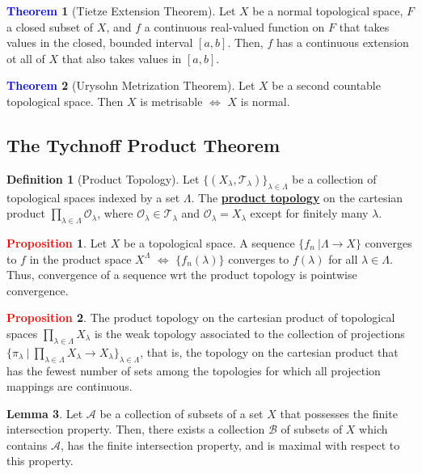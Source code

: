 \documentclass[11pt]{article}
\newcommand{\open}[0]{\mathcal{O}}
\newcommand{\topo}[0]{\mathcal{T}}
\theoremstyle{definition}
\theoremstyle{definition}
\newcommand{\dfn}[1]{\underline{\textbf{#1}}}
\newtheorem{theorem}{\textcolor{blue}{Theorem}}
\newtheorem{lemma}[theorem]{Lemma}
\theoremstyle{definition}
\newtheorem{definition}{\textcolor{OliveGreen}{Definition}}
\newtheorem{prop}{\textcolor{red}{Proposition}}
\theoremstyle{remark}
\begin{document}
\begin{theorem}[Tietze Extension Theorem]
	Let $X$ be a normal topological space, $F$ a closed subset of $X$, and $f$ a continuous real-valued function on $F$ that takes values in the closed, bounded interval $[a,b]$. Then, $f$ has a continuous extension ot all of $X$ that also takes values in $[a,b]$. 
\end{theorem}

\begin{theorem}[Urysohn Metrization Theorem] 
	Let $X$ be a second countable topological space. Then $X$ is metrisable $\iff$ $X$ is normal. 
\end{theorem}


\subsection{The Tychnoff Product Theorem}

\begin{definition}[Product Topology]
	Let $\{ (X_\lambda, \topo_\lambda ) \}_{\lambda \in \Lambda} $ be a collection of topological spaces indexed by a set $\Lambda$. The \dfn{product topology} on the cartesian product $\prod_{\lambda \in \Lambda} \open_\lambda$, where $\open_\lambda \in \topo_\lambda$ and $\open_\lambda = X_\lambda$ except for finitely many $\lambda$. 
\end{definition}

\begin{prop}
	Let $X$ be a topological space. A sequence $\{ f_n\ | \Lambda \rightarrow X \}$ converges to $f$ in the product space $X^\Lambda$ $\iff$  $\{ f_n (\lambda) \}$ converges to $f(\lambda)$ for all $\lambda \in \Lambda$. Thus, convergence of a sequence wrt the product topology is pointwise convergence. 
\end{prop}

\begin{prop}
	The product topology on the cartesian product of topological spaces $\prod_{\lambda \in \Lambda} X_\lambda$ is the weak topology associated to the collection of projections $\{ \pi_\lambda\ |\ \prod_{\lambda \in \Lambda} X_\lambda \rightarrow X_\lambda \}_{\lambda \in \Lambda} $, that is, the topology on the cartesian product that has the fewest number of sets among the topologies for which all projection mappings are continuous. 
\end{prop}

\begin{lemma}
	Let $\mathcal{A}$ be a collection of subsets of a set $X$ that possesses the finite intersection property. Then, there exists a collection $\mathcal{B}$ of subsets of $X$ which contains $\mathcal{A}$, has the finite intersection property, and is maximal with respect to this property. 
\end{lemma}
\end{document}

